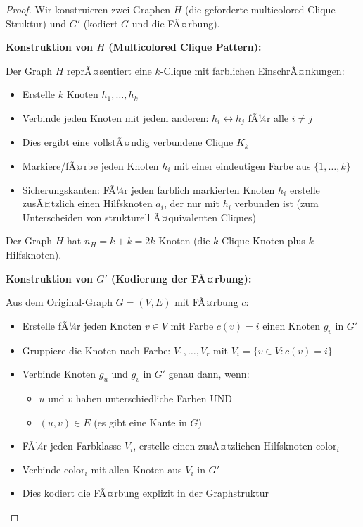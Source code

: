 ﻿\documentclass[a4paper,12pt]{article}
\theoremstyle{definition}
\begin{document}
\begin{proof}
	Wir konstruieren zwei Graphen $H$ (die geforderte multicolored Clique-Struktur) und $G'$ (kodiert $G$ und die FÃ¤rbung).
	
	\textbf{Konstruktion von $H$ (Multicolored Clique Pattern):}
	
	Der Graph $H$ reprÃ¤sentiert eine $k$-Clique mit farblichen EinschrÃ¤nkungen:
	\begin{itemize}
		\item Erstelle $k$ Knoten $h_1, \ldots, h_k$
		\item Verbinde jeden Knoten mit jedem anderen: $h_i \leftrightarrow h_j$ fÃ¼r alle $i \neq j$
		\item Dies ergibt eine vollstÃ¤ndig verbundene Clique $K_k$
		\item Markiere/fÃ¤rbe jeden Knoten $h_i$ mit einer eindeutigen Farbe aus $\{1, \ldots, k\}$
		\item Sicherungskanten: FÃ¼r jeden farblich markierten Knoten $h_i$ erstelle zusÃ¤tzlich einen Hilfsknoten $a_i$, der nur mit $h_i$ verbunden ist (zum Unterscheiden von strukturell Ã¤quivalenten Cliques)
	\end{itemize}
	
	Der Graph $H$ hat $n_H = k + k = 2k$ Knoten (die $k$ Clique-Knoten plus $k$ Hilfsknoten).
	
	\textbf{Konstruktion von $G'$ (Kodierung der FÃ¤rbung):}
	
	Aus dem Original-Graph $G = (V, E)$ mit FÃ¤rbung $c$:
	\begin{itemize}
		\item Erstelle fÃ¼r jeden Knoten $v \in V$ mit Farbe $c(v) = i$ einen Knoten $g_v$ in $G'$
		\item Gruppiere die Knoten nach Farbe: $V_1, \ldots, V_r$ mit $V_i = \{v \in V : c(v) = i\}$
		\item Verbinde Knoten $g_u$ und $g_v$ in $G'$ genau dann, wenn:
		\begin{itemize}
			\item $u$ und $v$ haben unterschiedliche Farben UND
			\item $(u, v) \in E$ (es gibt eine Kante in $G$)
		\end{itemize}
		\item FÃ¼r jeden Farbklasse $V_i$, erstelle einen zusÃ¤tzlichen Hilfsknoten $\text{color}_i$
		\item Verbinde $\text{color}_i$ mit allen Knoten aus $V_i$ in $G'$
		\item Dies kodiert die FÃ¤rbung explizit in der Graphstruktur
	\end{itemize}
	

\end{proof}
\end{document}
